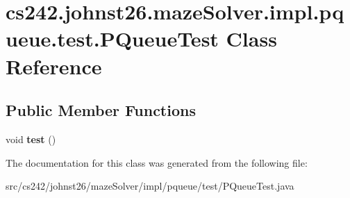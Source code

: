 \hypertarget{classcs242_1_1johnst26_1_1maze_solver_1_1impl_1_1pqueue_1_1test_1_1_p_queue_test}{\section{cs242.\-johnst26.\-maze\-Solver.\-impl.\-pqueue.\-test.\-P\-Queue\-Test Class Reference}
\label{classcs242_1_1johnst26_1_1maze_solver_1_1impl_1_1pqueue_1_1test_1_1_p_queue_test}
}
\subsection*{Public Member Functions}
\begin{DoxyCompactItemize}
\item 
\hypertarget{classcs242_1_1johnst26_1_1maze_solver_1_1impl_1_1pqueue_1_1test_1_1_p_queue_test_abd46314310e404d4d2fba66207e65e14}{void {\bfseries test} ()}\label{classcs242_1_1johnst26_1_1maze_solver_1_1impl_1_1pqueue_1_1test_1_1_p_queue_test_abd46314310e404d4d2fba66207e65e14}

\end{DoxyCompactItemize}


The documentation for this class was generated from the following file\-:\begin{DoxyCompactItemize}
\item 
src/cs242/johnst26/maze\-Solver/impl/pqueue/test/P\-Queue\-Test.\-java\end{DoxyCompactItemize}
